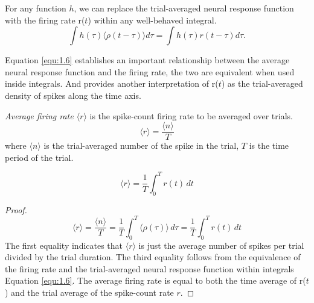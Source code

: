 \begin{thm}
  For any function $h$, 
  we can
replace the trial-averaged neural response function with the firing rate r($t$)
within any well-behaved integral.
  \begin{equation}
    \label{equ:1.6}
    \int h(\tau)\langle \rho(t-\tau)\rangle d\tau = \int h(\tau)r(t-\tau)d\tau.
  \end{equation}
\end{thm}

\begin{rem}
  Equation \ref{equ:1.6} establishes an important relationship between the
average neural response function and the firing rate, the two are equivalent when used inside 
integrals. And provides another interpretation of
  r($t$) as the trial-averaged density of spikes along the time axis.
\end{rem}

\begin{defn}
  \emph{Average firing rate $\langle r \rangle $} is the spike-count firing rate to be averaged over trials.
  \begin{equation}
    \label{equ:1.7}
    \langle r\rangle =\frac{\langle n\rangle }{T}
  \end{equation}
   where $\langle n \rangle $ is the trial-averaged number of the spike in the trial, 
   $T$ is the time period of the trial.
\end{defn}

\begin{prop}
  \begin{equation*}
    \langle r\rangle=\frac{1}{T}\int_{0}^{T}r(t)\,dt
  \end{equation*}
  \begin{proof}
    \begin{equation*}
      \langle r\rangle =\frac{\langle n\rangle }{T}
    =\frac{1}{T}\int_{0}^{T} \langle\rho(\tau) \rangle \,d\tau =\frac{1}{T}\int_{0}^{T}r(t)\,dt
    \end{equation*}
    The first equality indicates that $\langle r\rangle $ is just the average 
   number of spikes per trial divided by the trial duration. The third equality follows from
the equivalence of the firing rate and the trial-averaged neural response
function within integrals Equation \ref{equ:1.6}. The average firing rate is equal to
both the time average of r($t$) and the trial average of the spike-count rate $r$. 
  \end{proof}
\end{prop}

